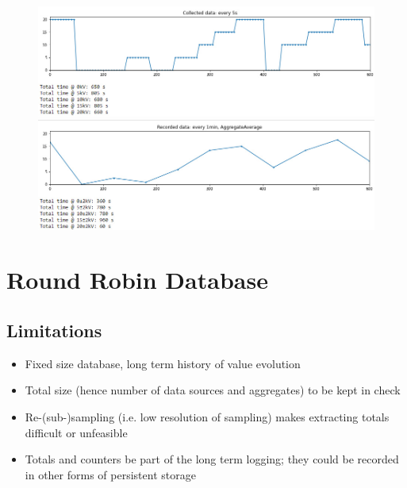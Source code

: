 \documentclass[t, 9pt, aspectratio=169]{beamer}
\begin{document}
    \begin{frame}{\secname}{\subsecname}
        \vspace{-0.5cm}
        \begin{figure}
            \hspace*{0cm}\includegraphics[scale=0.5]{collected-data-5s.jpg}
            \hspace*{0cm}\includegraphics[scale=0.5]{aggregate-avg-1min.jpg}
        \end{figure}
    \end{frame}

    \section{Round Robin Database}
    \subsection{Limitations}
    
    \begin{frame}{\secname}{\subsecname}
        \begin{itemize}
            \item Fixed size database\footnotemark, long term history of value evolution
            \item Total size (hence number of data sources and aggregates) to be kept in check
            \item Re-(sub-)sampling (i.e. low resolution of sampling) makes extracting totals difficult or unfeasible
            \item Totals and counters  be part of the long term logging; they could be recorded in other forms of persistent storage
        \end{itemize}
    \end{frame}
\end{document}
